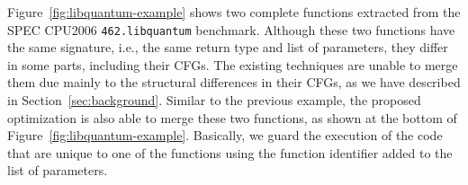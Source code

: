 Figure~\ref{fig:libquantum-example} shows two complete functions extracted from the SPEC CPU2006 \texttt{462.libquantum} benchmark.
Although these two functions have the same signature, i.e., the same return type and list of parameters, they differ in some parts,
including their CFGs. The existing techniques are unable to merge them due mainly to the structural differences in their CFGs, as we have
described in Section~\ref{sec:background}. Similar to the previous example, the proposed optimization is also able to merge these two
functions, as shown at the bottom of Figure~\ref{fig:libquantum-example}. Basically, we guard the execution of the code that are unique to
one of the functions using the function identifier added to the list of parameters.  

